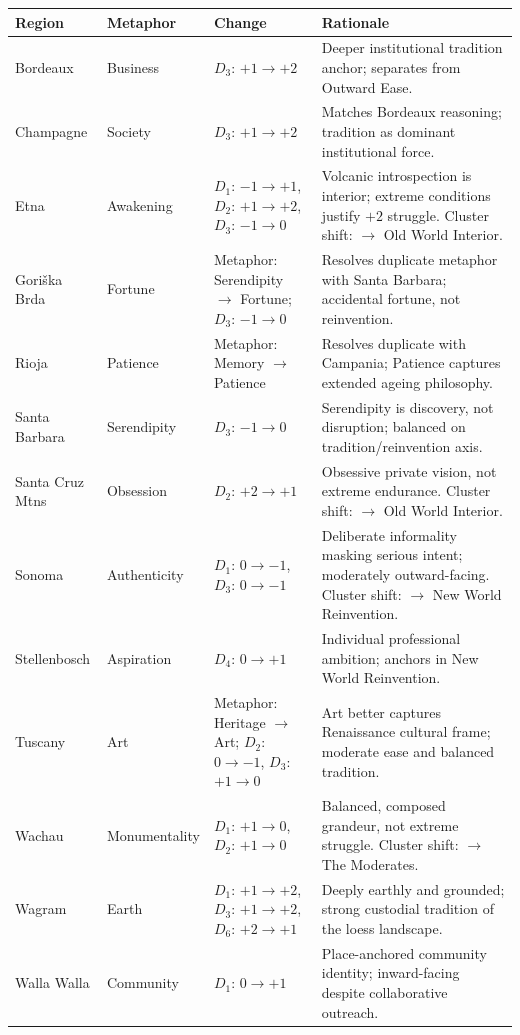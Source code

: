 \documentclass[11pt]{article}
\begin{document}
\begin{center}
\renewcommand{\arraystretch}{1.1}
\begin{tabular}{@{}lll p{6.5cm}@{}}
\toprule
Region & Metaphor & Change & Rationale \\
\midrule
Bordeaux         & Business      & $D_3$: $+1 \to +2$ & Deeper institutional tradition anchor; separates from Outward Ease. \\
Champagne        & Society       & $D_3$: $+1 \to +2$ & Matches Bordeaux reasoning; tradition as dominant institutional force. \\
Etna             & Awakening     & $D_1$: $-1 \to +1$, $D_2$: $+1 \to +2$, $D_3$: $-1 \to 0$ & Volcanic introspection is interior; extreme conditions justify $+2$ struggle. Cluster shift: $\to$ Old World Interior. \\
Gori\v{s}ka Brda & Fortune       & Metaphor: Serendipity $\to$ Fortune; $D_3$: $-1 \to 0$ & Resolves duplicate metaphor with Santa Barbara; accidental fortune, not reinvention. \\
Rioja            & Patience      & Metaphor: Memory $\to$ Patience & Resolves duplicate with Campania; Patience captures extended ageing philosophy. \\
Santa Barbara    & Serendipity   & $D_3$: $-1 \to 0$ & Serendipity is discovery, not disruption; balanced on tradition/reinvention axis. \\
Santa Cruz Mtns  & Obsession     & $D_2$: $+2 \to +1$ & Obsessive private vision, not extreme endurance. Cluster shift: $\to$ Old World Interior. \\
Sonoma           & Authenticity  & $D_1$: $0 \to -1$, $D_3$: $0 \to -1$ & Deliberate informality masking serious intent; moderately outward-facing. Cluster shift: $\to$ New World Reinvention. \\
Stellenbosch     & Aspiration    & $D_4$: $0 \to +1$ & Individual professional ambition; anchors in New World Reinvention. \\
Tuscany          & Art           & Metaphor: Heritage $\to$ Art; $D_2$: $0 \to -1$, $D_3$: $+1 \to 0$ & Art better captures Renaissance cultural frame; moderate ease and balanced tradition. \\
Wachau           & Monumentality & $D_1$: $+1 \to 0$, $D_2$: $+1 \to 0$ & Balanced, composed grandeur, not extreme struggle. Cluster shift: $\to$ The Moderates. \\
Wagram           & Earth         & $D_1$: $+1 \to +2$, $D_3$: $+1 \to +2$, $D_6$: $+2 \to +1$ & Deeply earthly and grounded; strong custodial tradition of the loess landscape. \\
Walla Walla      & Community     & $D_1$: $0 \to +1$ & Place-anchored community identity; inward-facing despite collaborative outreach. \\
\bottomrule
\end{tabular}
\end{center}
\end{document}

